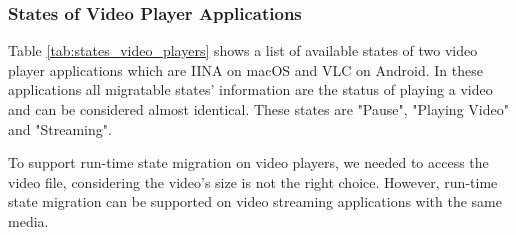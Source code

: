 \subsubsection{States of Video Player Applications}
Table \ref{tab:states_video_players} shows a list of available states of two video player applications which are IINA on macOS  and VLC on Android. In these applications all migratable states' information are the status of playing a video and can be considered almost identical. These states are "Pause", "Playing Video" and "Streaming". 

To support run-time state migration on video players, we needed to access the video file, considering the video's size is not the right choice. However, run-time state migration can be supported on video streaming applications with the same media.


